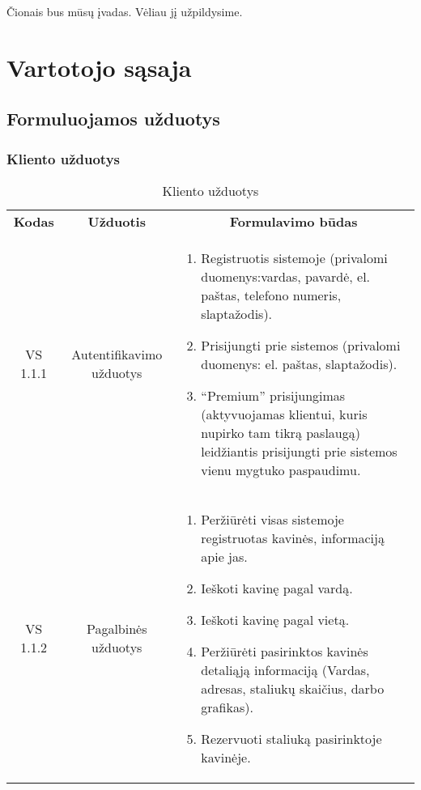 \documentclass{VUMIFPSkursinis}
\begin{document}
Čionais bus mūsų įvadas. Vėliau jį užpildysime.
\newline


\section{Vartotojo sąsaja}

\subsection{Formuluojamos užduotys}
\subsubsection{Kliento užduotys}
\begin{center}
	\begin{table}[H]
	\begin{tabular}{|p{2cm}|p{}|p{}|}
	\hline
	    \rowcolor{lightgray}
		\multicolumn{3}{|c|}{Kliento užduotys}\\
		
	\hline
		\multicolumn{1}{|c|}{{\bfseries Kodas}}&
		\multicolumn{1}{|c|}{{\bfseries Užduotis}}&
		\multicolumn{1}{|c|}{{\bfseries Formulavimo būdas}}\\		
	\hline
		\multicolumn{1}{|c|}{VS 1.1.1}& 	
		\multicolumn{1}{|c|}{Autentifikavimo užduotys}&
		{
			\begin{enumerate}
				\item Registruotis sistemoje
				(privalomi duomenys:vardas, pavardė, el. paštas, telefono numeris, slaptažodis).
				\item Prisijungti prie sistemos (privalomi duomenys: el. paštas, slaptažodis).
				\item “Premium” prisijungimas (aktyvuojamas klientui, kuris nupirko tam tikrą paslaugą) leidžiantis prisijungti prie sistemos vienu mygtuko paspaudimu.
			\end{enumerate}}\\
	
	\hline
		\multicolumn{1}{|c|}{VS 1.1.2}&  	
		\multicolumn{1}{|c|}{Pagalbinės užduotys}&
		{
			\begin{enumerate}
				\item Peržiūrėti visas sistemoje registruotas kavinės, informaciją apie jas.
				\item Ieškoti kavinę pagal vardą.
				\item Ieškoti kavinę pagal vietą.
				\item Peržiūrėti pasirinktos kavinės detaliąją informaciją (Vardas, adresas, staliukų skaičius, darbo grafikas).
				\item Rezervuoti staliuką pasirinktoje kavinėje.
			\end{enumerate}}\\
	
	\hline 	 	
	\end{tabular}
	\caption{Kliento užduotys}
	\label{table:1}
	\end{table}

\end{center}
\end{document}
